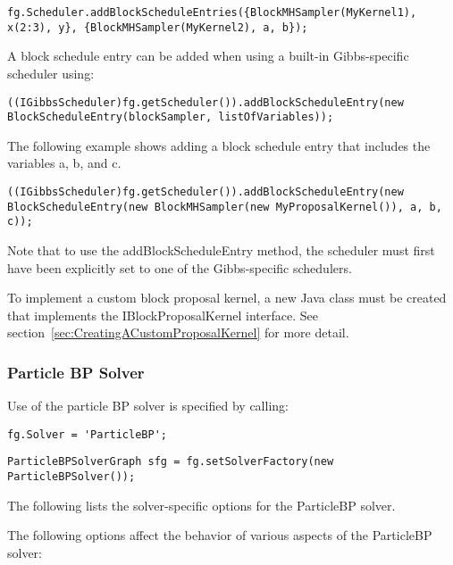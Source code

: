 \begin{lstlisting}
fg.Scheduler.addBlockScheduleEntries({BlockMHSampler(MyKernel1), x(2:3), y}, {BlockMHSampler(MyKernel2), a, b});
\end{lstlisting}

\fi

\ifjava
A block schedule entry can be added when using a built-in Gibbs-specific scheduler using:

\begin{lstlisting}
((IGibbsScheduler)fg.getScheduler()).addBlockScheduleEntry(new BlockScheduleEntry(blockSampler, listOfVariables));
\end{lstlisting}

The following example shows adding a block schedule entry that includes the variables a, b, and c.

\begin{lstlisting}
((IGibbsScheduler)fg.getScheduler()).addBlockScheduleEntry(new BlockScheduleEntry(new BlockMHSampler(new MyProposalKernel()), a, b, c));
\end{lstlisting}

Note that to use the addBlockScheduleEntry method, the scheduler must first have been explicitly set to one of the Gibbs-specific schedulers.
\fi

To implement a custom block proposal kernel, a new Java class must be created that implements the IBlockProposalKernel interface.  See section~\ref{sec:CreatingACustomProposalKernel} for more detail.

\clearpage
\subsubsection{Particle BP Solver}

Use of the particle BP solver is specified by calling:

\ifmatlab
\begin{lstlisting}
fg.Solver = 'ParticleBP';
\end{lstlisting}
\fi
\ifjava
\begin{lstlisting}
ParticleBPSolverGraph sfg = fg.setSolverFactory(new ParticleBPSolver());
\end{lstlisting}
\fi

The following lists the solver-specific options for the ParticleBP solver.


The following options affect the behavior of various aspects of the ParticleBP solver:

